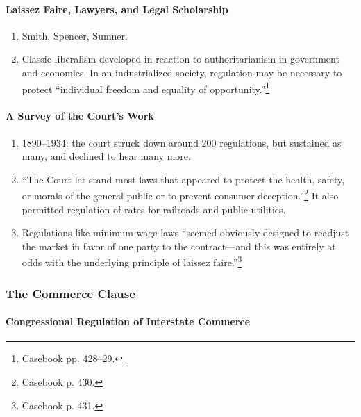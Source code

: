 \paragraph{Laissez Faire, Lawyers, and Legal Scholarship}

\begin{enumerate}
    \item Smith, Spencer, Sumner.
    \item Classic liberalism developed in reaction to authoritarianism in 
    government and economics. In an industrialized society, regulation may be 
    necessary to protect ``individual freedom and equality of 
    opportunity.''\footnote{Casebook pp. 428--29.}
\end{enumerate}

\paragraph{A Survey of the Court's Work}

\begin{enumerate}
    \item 1890--1934: the court struck down around 200 regulations, but 
    sustained as many, and declined to hear many more.
    \item ``The Court let stand most laws that appeared to protect the health, 
    safety, or morals of the general public or to prevent consumer 
    deception.''\footnote{Casebook p. 430.} It also permitted regulation of 
    rates for railroads and public utilities.
    \item Regulations like minimum wage laws ``seemed obviously designed to 
    readjust the market in favor of one party to the contract---and this was 
    entirely at odds with the underlying principle of laissez 
    faire.''\footnote{Casebook p. 431.}
\end{enumerate}

\subsubsection{The Commerce Clause} 

\paragraph{Congressional Regulation of Interstate Commerce}

